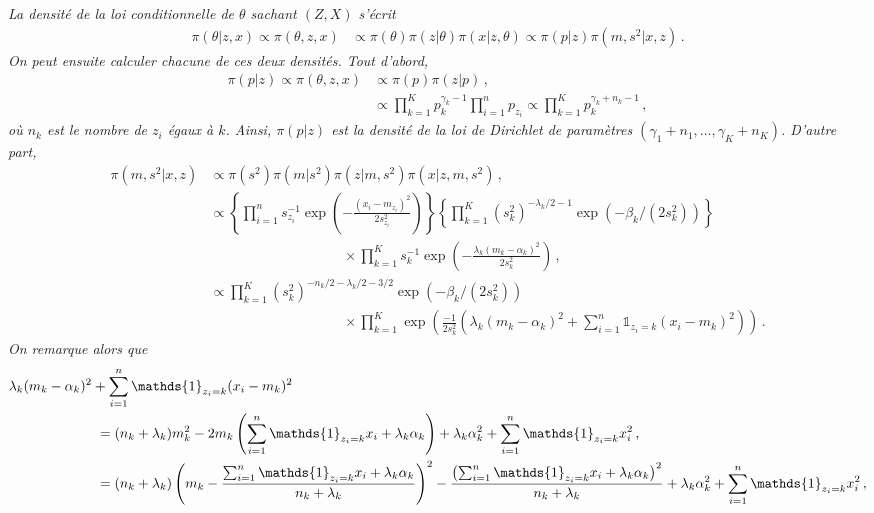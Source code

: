 \documentclass[a4paper,10pt,fleqn]{article}
\newcommand{\1}{\ensuremath{\mathbbm{1}}}
\begin{document}
\begin{enumerate}
{\em
La densit\'e de la loi conditionnelle de $\theta$ sachant $(Z,X)$ s'\'ecrit
\begin{align*}
\pi(\theta|z,x)\propto \pi(\theta,z,x) &\propto \pi(\theta)\pi(z|\theta) \pi(x|z,\theta)\propto \pi(p|z)\pi(m,s^2|x,z)\,.
\end{align*}
On peut ensuite calculer chacune de ces deux densit\'es. Tout d'abord,
\begin{align*}
\pi(p|z)\propto \pi(\theta,z,x) &\propto \pi(p)\pi(z|p) \,,\\
&\propto \prod_{k=1}^Kp_k^{\gamma_k-1} \prod_{i=1}^n p_{z_i} \propto \prod_{k=1}^Kp_k^{\gamma_k+n_k-1}\,,
\end{align*}
o\`u $n_k$ est le nombre de $z_i$ \'egaux \`a $k$. Ainsi, $\pi(p|z)$ est la densit\'e de la loi de Dirichlet de param\`etres $(\gamma_1+n_1,\ldots,\gamma_K+n_K)$. D'autre part, 
\begin{align*}
\pi(m,s^2|x,z)&\propto \pi(s^2) \pi(m|s^2)\pi(z|m,s^2)\pi(x|z,m,s^2) \,,\\
&\propto \left\{\prod_{i=1}^n s_{z_i}^{-1}\exp\left(-\frac{(x_i-m_{z_i})^2}{2s_{z_i}^2}\right)\right\} \left\{\prod_{k=1}^K (s^2_k)^{-\lambda_k/2-1}\exp(-\beta_k/(2s_k^2))\right\}\\
&\hspace{4cm}\times \prod_{k=1}^K  s_{k}^{-1}\exp\left(-\frac{\lambda_k(m_k-\alpha_{k})^2}{2s_{k}^2}\right)\,,\\
&\propto\prod_{k=1}^K  (s_{k}^2)^{-n_k/2-\lambda_k/2-3/2}\exp(-\beta_k/(2s_k^2))\\
&\hspace{4cm}\times\prod_{k=1}^K \exp\left(\frac{-1}{2s_k^2}\left(\lambda_k(m_k-\alpha_k)^2 + \sum_{i=1}^n\mathds{1}_{z_i=k}(x_i-m_k)^2\right)\right)\,.
\end{align*}
On remarque alors que
\begin{align*}
\lambda_k(m_k-\alpha_k)^2 + \sum_{i=1}^n\mathds{1}_{z_i=k}(x_i-m_k)^2 &\\
&\hspace{-5cm}= (n_k+\lambda_k)m_k^2 -2m_k\left(\sum_{i=1}^n\mathds{1}_{z_i=k}x_i+\lambda_k\alpha_k\right) + \lambda_k\alpha_k^2 +\sum_{i=1}^n\mathds{1}_{z_i=k}x^2_i\,,\\
&\hspace{-5cm}= (n_k+\lambda_k)\left(m_k-\frac{\sum_{i=1}^n\mathds{1}_{z_i=k}x_i+\lambda_k\alpha_k}{n_k+\lambda_k}\right)^2 - \frac{\left(\sum_{i=1}^n\mathds{1}_{z_i=k}x_i+\lambda_k\alpha_k\right)^2}{n_k+\lambda_k} + \lambda_k\alpha_k^2 +\sum_{i=1}^n\mathds{1}_{z_i=k}x^2_i\,,\\

\end{align*}}
\end{enumerate}
\end{document}
